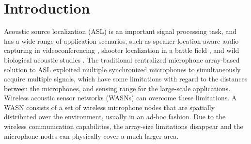 
\section{Introduction}

Acoustic source localization (ASL) is an important signal processing task, and has a wide range of application scenarios, such
as speaker-location-aware audio capturing in videoconferencing \cite{guo2011localising}, shooter localization in a battle field \cite{sallai2011acoustic}, and wild biological acoustic studies \cite{allen2008voxnet}. 
The traditional centralized microphone array-based solution to ASL exploited multiple synchronized microphones to simultaneously acquire multiple signals, 
which have some limitations with regard to the distances between the microphones, and sensing range for the large-scale applications.
Wireless acoustic sensor networks (WASNs) can overcome these limitations. 
A WASN consists of a set of wireless microphone nodes that are spatially distributed over the environment, usually in an ad-hoc fashion. 
Due to the wireless communication capabilities, the array-size limitations disappear and the microphone nodes can physically cover a much larger area. 

